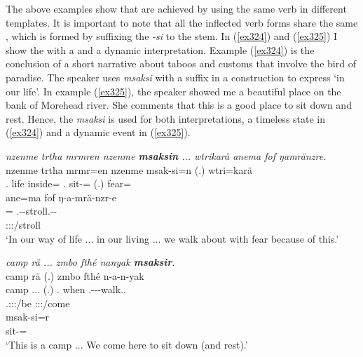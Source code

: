 The above examples show that  are achieved by using the same verb in different templates. It is important to note that all the inflected verb forms share the same , which is formed by suffixing the  \emph{-si} to the stem. In (\ref{ex324}) and (\ref{ex325}) I show the  with a  and a dynamic interpretation. Example (\ref{ex324}) is the conclusion of a short narrative about taboos and customs that involve the bird of paradise. The speaker uses \emph{msaksi} with a   suffix in a  construction to express `in our life'. In example (\ref{ex325}), the speaker showed me a beautiful place on the bank of Morehead river. She comments that this is a good place to sit down and rest. Hence, the  \emph{msaksi} is used for both interpretations, a timeless state in (\ref{ex324}) and a dynamic event in (\ref{ex325}).

\begin{exe}
	\ex \emph{nzenme trtha mrmren nzenme \textbf{msaksin} ... wtrikarä anema fof ŋamränzre.}\\
	\gll nzenme trtha mrmr=en nzenme msak-si=n (.) wtri=karä\\
	\Fnsg.\Poss{} life inside=\Loc{} \Fnsg.\Poss{} sit-\Nmlz=\Loc{} (.) fear=\Prop{}\\
	\sn
	\glll ane=ma fof ŋ-a-mrä-nzr-e\\
	\Dem=\Char{} \Emph{} \M.\Alph-\Vc-stroll.\Ext-\Ndu-\Fnsg{}\\
	{} {} \footnotesize{\Fpl:\Sbj:\Nonpast:\Ipfv/stroll}\\
	\trans `In our way of life ... in our living ... we walk about with fear because of this.' 
	\label{ex324}
\end{exe}
\begin{exe}
	\ex \emph{camp rä ... zmbo fthé nanyak \textbf{msaksir}.}\\
	\glll camp rä (.) zmbo fthé n-a-n-yak\\
	camp \Tsg.\F.\Cop.\Ndu{} (.) \Prox.\All{} when \Fnsg.\Alph-\Vc-\Venit-walk.\Ext.\Ndu{}\\
	{} \footnotesize{\Tsg.\F:\Sbj:\Nonpast:\Ipfv/be} {} {} {} \footnotesize{\Fpl:\Sbj:\Nonpast:\Ipfv/come}\\
	\sn
	\gll msak-si=r\\
	sit-\Nmlz=\Purp{}\\
	\trans `This is a camp ... We come here to sit down (and rest).'\\ 
	\label{ex325}
\end{exe}

